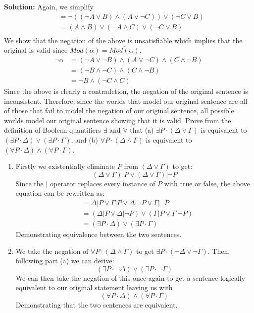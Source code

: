 \documentclass[11pt]{exam}
\begin{document}
\begin{questions}
\textbf{Solution:} Again, we simplify
\begin{align*}
&= \neg((\neg A \lor B) \land (A \lor \neg C)) \lor (\neg C \lor B)\\
&= (A \land B) \lor (\neg A \land C) \lor (\neg C \lor B)\\
\end{align*}
We show that the negation of the above is unsatisfiable which implies that the original is valid since $Mod(\overline{\alpha}) = \overline{ Mod(\alpha)}$.
\begin{align*}
\neg \alpha &= (\neg A \lor \neg B) \land (A \lor \neg C) \land (C \land \neg B)\\
&= (\neg B \land \neg C) \land (C \land \neg B)\\
&= \neg B \land (\neg C \land C)
\end{align*}
Since the above is clearly a contradction, the negation of the original sentence is inconsistent. Therefore, since the worlds that model our original sentence are all of those that fail to model the negation of our original sentence, all possible worlds model our original sentence showing that it is valid.
\newpage
\question[8] Prove from the definition of Boolean quantifiers $\exists$ and $\forall$ that (a) $\exists P \cdot (\Delta \lor \Gamma)$ is equivalent to $(\exists P \cdot \Delta) \lor (\exists P \cdot \Gamma)$, and (b) $\forall P \cdot (\Delta \land \Gamma)$ is equivalent to $(\forall P \cdot \Delta) \land (\forall P \cdot \Gamma)$. 
\begin{enumerate}[label=(\alph*)]
    \item Firstly we existentially eliminate $P$ from $(\Delta \lor \Gamma)$ to get: $$(\Delta \lor \Gamma) | P \lor (\Delta \lor \Gamma) | \lnot P$$Since the $|$ operator replaces every instance of $P$ with true or false, the above equation can be rewritten as:\begin{align*}
    &= \Delta | P \lor \Gamma | P \lor \Delta | \lnot P \lor \Gamma | \lnot P\\
    &= (\Delta | P \lor \Delta | \lnot P) \lor (\Gamma | P \lor \Gamma | \lnot P)\\
    &= (\exists P \cdot \Delta) \lor (\exists P \cdot \Gamma)
    \end{align*}
    Demonstrating equivalence between the two sentences.
    \item We take the negation of $\forall P \cdot (\Delta \land \Gamma)$ to get $\exists P \cdot (\lnot \Delta \lor \lnot \Gamma)$. Then, following part (a) we can derive:
    $$
    (\exists P \cdot \lnot \Delta) \lor (\exists P \cdot \lnot \Gamma)
    $$
    We can then take the negation of this once again to get a sentence logically equivalent to our original statement leaving us with
    $$(\forall P \cdot \Delta) \land (\forall P \cdot \Gamma)$$
    Demonstrating that the two sentences are equivalent.
\end{enumerate}


\end{questions}
\end{document}
